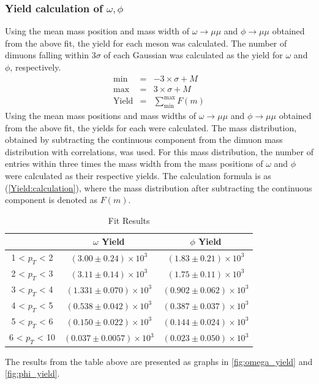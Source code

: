         \subsubsection{Yield calculation of $\omega,\phi$} 
            Using the mean mass position and mass width of $\omega \rightarrow \mu\mu$ and $\phi \rightarrow \mu\mu$ obtained from the above fit, the yield for each meson was calculated. The number of dimuons falling within 3$\sigma$ of each Gaussian was calculated as the yield for $\omega$ and $\phi$, respectively.
            \begin{eqnarray}
                \mathrm{min} &=&  -3 \times \sigma + M \\
                \mathrm{max} &=&  3 \times \sigma + M \\
                \mathrm{Yield} &=& \sum_{\mathrm{min}}^{\mathrm{max}} F(m)
                \label{Yield:calculation}
            \end{eqnarray}
            Using the mean mass positions and mass widths of \(\omega \rightarrow \mu\mu\) and \(\phi \rightarrow \mu\mu\) obtained from the above fit, the yields for each were calculated. The mass distribution, obtained by subtracting the continuous component from the dimuon mass distribution with correlations, was used. For this mass distribution, the number of entries within three times the mass width from the mass positions of \(\omega\) and \(\phi\) were calculated as their respective yields. The calculation formula is as (\ref{Yield:calculation}), where the mass distribution after subtracting the continuous component is denoted as \(F(m)\).
            \begin{table}[htbp]
                \centering
                \caption{Fit Results}
                \begin{tabular}{|c||c|c|}
                    \hline
                    & $\omega$ Yield & $\phi$ Yield \\ \hline \hline
                    1 < $p_{T}$ < 2 &$(3.00\pm0.24)\times10^3$& $(1.83\pm0.21)\times10^3$\\ \hline
                    2 < $p_{T}$ < 3 &$(3.11\pm0.14)\times10^3$& $(1.75\pm0.11)\times10^3$\\ \hline
                    3 < $p_{T}$ < 4 &$(1.331\pm0.070)\times10^3$& $(0.902\pm0.062)\times10^3$\\ \hline
                    4 < $p_{T}$ < 5 &$(0.538\pm0.042)\times10^3$& $(0.387\pm0.037)\times10^3$\\ \hline
                    5 < $p_{T}$ < 6 &$(0.150\pm0.022)\times10^3$& $(0.144\pm0.024)\times10^3$\\ \hline
                    6 < $p_{T}$ < 10 &$(0.037\pm0.0057)\times10^3$& $(0.023\pm0.050)\times10^3$\\ \hline     
                \end{tabular}
                \label{Analysis:Dimuon:Yield:Results}
            \end{table}
            The results from the table above are presented as graphs in \ref{fig:omega_yield} and \ref{fig:phi_yield}.

